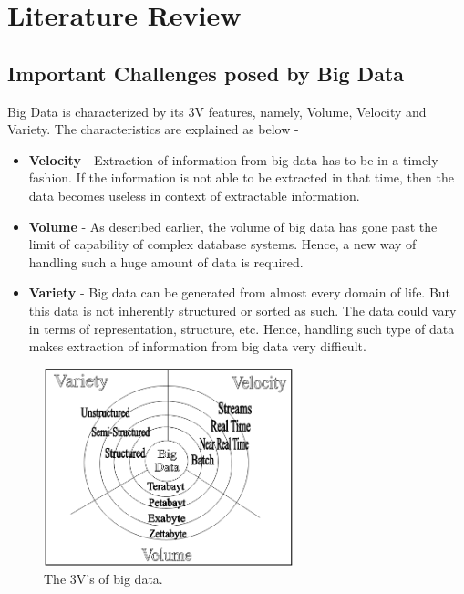 \documentclass[journal]{IEEEtran}
\begin{document}
\section{Literature Review}

\subsection{Important Challenges posed by Big Data}
Big Data is characterized by its 3V features, namely, Volume, Velocity and Variety. The characteristics are explained as below -
	\begin{itemize}
    	\item \textbf{Velocity} - Extraction of information from big data has to be in a timely fashion. If the information is not able to be extracted in that time, then the data becomes useless in context of extractable information.
        \item \textbf{Volume} - As described earlier, the volume of big data has gone past the limit of capability of complex database systems. Hence, a new way of handling such a huge amount of data is required.
        \item \textbf{Variety} - Big data can be generated from almost every domain of life. But this data is not inherently structured or sorted as such. The data could vary in terms of representation, structure, etc. Hence, handling such type of data makes extraction of information from big data very difficult.
    \end{itemize}
\begin{figure}[!ht]
	\centering
    \includegraphics[scale=0.9]{Selection_038.png}
    \caption{The 3V's of big data. \cite{6567202}}
    \label{3v}
\end{figure}
\end{document}
